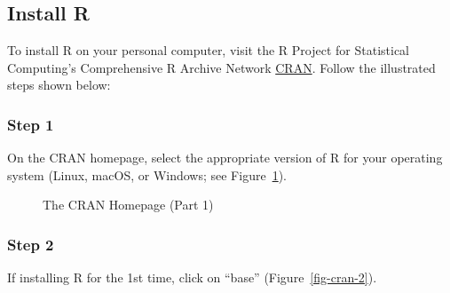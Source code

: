\documentclass[
  letterpaper,
  DIV=11,
  numbers=noendperiod]{scrreprt}
\begin{document}
\subsection{Install R}\label{install-r}

To install R on your personal computer, visit the R Project for
Statistical Computing's Comprehensive R Archive Network
\href{https://cloud.r-project.org/}{CRAN}. Follow the illustrated steps
shown below:

\subsubsection{Step 1}\label{step-1}

On the CRAN homepage, select the appropriate version of R for your
operating system (Linux, macOS, or Windows; see
Figure~\ref{fig-cran-1}).

\begin{figure}


\caption{\label{fig-cran-1}The CRAN Homepage (Part 1)}

\end{figure}%

\subsubsection{Step 2}\label{step-2}

If installing R for the 1st time, click on ``base''
(Figure~\ref{fig-cran-2}).
\end{document}
